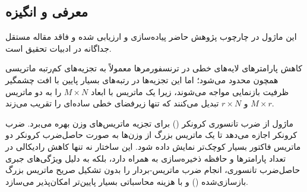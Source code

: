 \subsection{معرفی و انگیزه}
این ماژول در چارچوب پژوهش حاضر پیاده‌سازی و ارزیابی شده و فاقد مقاله مستقل جداگانه در ادبیات تحقیق است.

کاهش پارامترهای لایه‌های خطی در ترنسفورمرها معمولاً به تجزیه‌های کم‌رتبه ماتریسی همچون  محدود می‌شود؛ اما این تجزیه‌ها در رتبه‌های بسیار پایین با افت چشمگیر ظرفیت بازنمایی مواجه می‌شوند، زیرا یک ماتریس با ابعاد $M \times N$ را به دو ماتریس $M \times r$ و $r \times N$ تبدیل می‌کنند که تنها زیرفضای خطی ساده‌ای را تقریب می‌زند.

ماژول  از ضرب تانسوری کرونکر () برای تجزیه ماتریس‌های وزن بهره می‌برد. ضرب کرونکر اجازه می‌دهد تا یک ماتریس بزرگ از وزن‌ها به صورت حاصل‌ضرب کرونکر دو ماتریس فاکتور بسیار کوچک‌تر نمایش داده شود. این ساختار نه تنها کاهش رادیکالی در تعداد پارامترها و حافظه ذخیره‌سازی به همراه دارد، بلکه به دلیل ویژگی‌های جبری حاصل‌ضرب تانسوری، انجام ضرب ماتریس-بردار را بدون تشکیل صریح ماتریس بزرگ بازسازی‌شده () و با هزینه محاسباتی بسیار پایین‌تر امکان‌پذیر می‌سازد.
